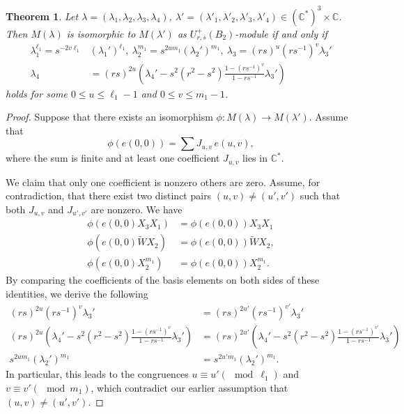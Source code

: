 \documentclass[12 pt,reqno]{amsart}
\numberwithin{equation}{section}
\newtheorem{thm}{Theorem}[section]
\theoremstyle{definition}
\theoremstyle{definition}
\theoremstyle{remark}
\theoremstyle{remark}
\begin{document}
\begin{thm}\label{1stIso}
    Let $\lambda=(\lambda_1,\lambda_2,\lambda_3,\lambda_4)$, $\lambda'=(\lambda'_1,\lambda'_2,\lambda'_3,\lambda'_4) \in(\mathbb{C}^*)^3 \times \mathbb{C}$. Then $M(\lambda)$ is isomorphic to $M(\lambda')$ as $U_{r,s}^+(B_2)$-module if and only if 
    \begin{align*}
    \lambda_1^{\ell_1}=s^{-2v\ell_1}&(\lambda_1')^{\ell_1}, \ \lambda_2^{m_1}=s^{2um_1}(\lambda_2')^{m_1}, \ \lambda_3=(rs)^u(rs^{-1})^v\lambda_3'\\
    \lambda_4&=(rs)^{2u}\left(\lambda_4'-s^2(r^2-s^2)\displaystyle\frac{1-(rs^{-1})^v}{1-rs^{-1}}\lambda_3'\right)
\end{align*} holds for some $0 \leq u \leq \ell_1-1$ and $0 \leq v \leq m_1-1$.
\end{thm}
\begin{proof}
Suppose that there exists an isomorphism $\phi: M(\lambda) \to M(\lambda')$. Assume that
\[
\phi(e(0,0)) = \sum J_{u,v} \, e(u,v),
\]
where the sum is finite and at least one coefficient $J_{u,v}$ lies in $\mathbb{C}^*$.

\noindent We claim that only one coefficient is nonzero others are zero. Assume, for contradiction, that there exist two distinct pairs $(u,v) \neq (u',v')$ such that both $J_{u,v}$ and $J_{u',v'}$ are nonzero. We have
\begin{align*}
   \phi(e{(0,0)} X_3 X_1)& = \phi(e{(0,0)}) X_3 X_1 \\
   \phi(e{(0,0)} \tilde{W}X_2) &= \phi(e{(0,0)}) \tilde{W}X_2, \\ \phi(e{(0,0)}X_2^{m_1})& = \phi(e{(0,0)}) X_2^{m_1}. 
\end{align*}
\noindent By comparing the coefficients of the basis elements on both sides of these identities, we derive the following
\begin{align*}
    (rs)^{2u}(rs^{-1})^v \lambda_3'&=(rs)^{2u'}(rs^{-1})^{v'} \lambda_3'\\
        (rs)^{2u}\left(\lambda_4'-s^2(r^2-s^2)\displaystyle\frac{1-(rs^{-1})^v}{1-rs^{-1}}\lambda_3'\right)&=(rs)^{2u'}\left(\lambda_4'-s^2(r^2-s^2)\displaystyle\frac{1-(rs^{-1})^{v'}}{1-rs^{-1}}\lambda_3'\right)\\
        s^{2um_1}(\lambda_2')^{m_1}&=s^{2u'm_1}(\lambda_2')^{m_1}.
\end{align*}
In particular, this leads to the congruences $u \equiv u' (\mod \ell_1)$ and $v \equiv v' (\mod m_1)$, which contradict our earlier assumption that $(u,v) \neq (u',v')$.


\end{proof}
\end{document}
